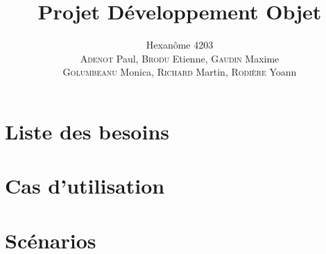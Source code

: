 


\title{\textbf{Projet Développement Objet}}
\author{Hexanôme 4203\\
\textsc{Adenot} Paul, \textsc{Brodu} Etienne, \textsc{Gaudin} Maxime\\
\textsc{Golumbeanu} Monica, \textsc{Richard} Martin, \textsc{Rodière} Yoann}

\graphicspath{{./img/}{../img/}{../../img/}{../../../img/}}


	\maketitle
	\tableofcontents

	\newpage
	\part{Liste des besoins}
	
	

	\newpage
	\part{Cas d'utilisation}
	
	

	\newpage
	\part{Scénarios}
	
	

